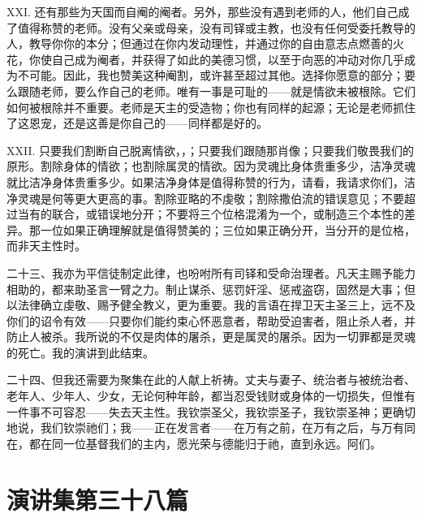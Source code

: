XXI. 还有那些为天国而自阉的阉者。另外，那些没有遇到老师的人，他们自己成了值得称赞的老师。没有父亲或母亲，没有司铎或主教，也没有任何受委托教导的人，教导你你的本分；但通过在你内发动理性，并通过你的自由意志点燃善的火花，你使自己成为阉者，并获得了如此的美德习惯，以至于向恶的冲动对你几乎成为不可能。因此，我也赞美这种阉割，或许甚至超过其他。选择你愿意的部分；要么跟随老师，要么作自己的老师。唯有一事是可耻的——就是情欲未被根除。它们如何被根除并不重要。老师是天主的受造物；你也有同样的起源；无论是老师抓住了这恩宠，还是这善是你自己的——同样都是好的。\par

XXII. 只要我们割断自己脱离情欲，，；只要我们跟随那肖像；只要我们敬畏我们的原形。割除身体的情欲；也割除属灵的情欲。因为灵魂比身体贵重多少，洁净灵魂就比洁净身体贵重多少。如果洁净身体是值得称赞的行为，请看，我请求你们，洁净灵魂是何等更大更高的事。割除亚略的不虔敬；割除撒伯流的错误意见；不要超过当有的联合，或错误地分开；不要将三个位格混淆为一个，或制造三个本性的差异。那一位如果正确理解就是值得赞美的；三位如果正确分开，当分开的是位格，而非天主性时。\par

二十三、我亦为平信徒制定此律，也吩咐所有司铎和受命治理者。凡天主赐予能力相助的，都来助圣言一臂之力。制止谋杀、惩罚奸淫、惩戒盗窃，固然是大事；但以法律确立虔敬、赐予健全教义，更为重要。我的言语在捍卫天主圣三上，远不及你们的诏令有效——只要你们能约束心怀恶意者，帮助受迫害者，阻止杀人者，并防止人被杀。我所说的不仅是肉体的屠杀，更是属灵的屠杀。因为一切罪都是灵魂的死亡。我的演讲到此结束。\par

二十四、但我还需要为聚集在此的人献上祈祷。丈夫与妻子、统治者与被统治者、老年人、少年人、少女，无论何种年龄，都当忍受钱财或身体的一切损失，但惟有一件事不可容忍——失去天主性。我钦崇圣父，我钦崇圣子，我钦崇圣神；更确切地说，我们钦崇祂们；我——正在发言者——在万有之前，在万有之后，与万有同在，都在同一位基督我们的主内，愿光荣与德能归于祂，直到永远。阿们。\par



\section{演讲集第三十八篇}

